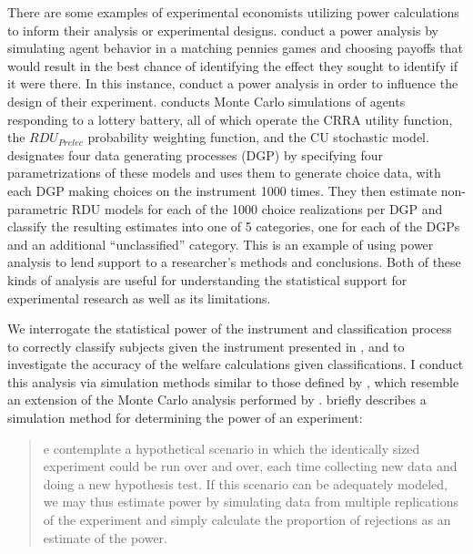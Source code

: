 \documentclass[../main.tex]{subfiles}
\begin{document}
There are some examples of experimental economists utilizing power calculations to inform their analysis or experimental designs.
\textcite{Rutstrom2009} conduct a power analysis by simulating agent behavior in a matching pennies games and choosing payoffs that would result in the best chance of identifying the effect they sought to identify if it were there.
In this instance, \textcite{Rutstrom2009} conduct a power analysis in order to influence the design of their experiment.
\textcite[8]{Wilcox2015} conducts Monte Carlo simulations of agents responding to a lottery battery, all of which operate the CRRA utility function, the $\mathit{RDU_{Prelec}}$ probability weighting function, and the CU stochastic model.
\textcite{Wilcox2015} designates four data generating processes (DGP) by specifying four parametrizations of these models and uses them to generate choice data, with each DGP making choices on the instrument 1000 times.
They then estimate non-parametric RDU models for each of the 1000 choice realizations per DGP and classify the resulting estimates into one of 5 categories, one for each of the DGPs and an additional \enquote{unclassified} category.
This is an example of using power analysis to lend support to a researcher's methods and conclusions.
Both of these kinds of analysis are useful for understanding the statistical support for experimental research as well as its limitations.

We interrogate the statistical power of the instrument and classification process to correctly classify subjects given the instrument presented in \textcite{Harrison2016}, and to investigate the accuracy of the welfare calculations given classifications.
I conduct this analysis via simulation methods similar to those defined by \textcite{Feiveson2002}, which resemble an extension of the Monte Carlo analysis performed by \textcite{Wilcox2015}.
\textcite[108]{Feiveson2002} briefly describes a simulation method for determining the power of an experiment:

\blockquote{e contemplate a hypothetical scenario in which the identically sized experiment could be run over and over, each time collecting new data and doing a new hypothesis test. 
If this scenario can be adequately modeled, we may thus estimate power by simulating data from multiple replications of the experiment and simply calculate the proportion of rejections  as an estimate of the power.}
\end{document}

